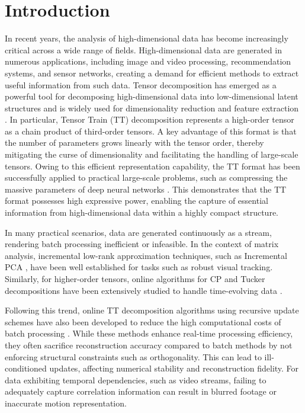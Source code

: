 \documentclass[a4paper, 11pt]{article}
\theoremstyle{plain}
\theoremstyle{definition}
\theoremstyle{remark}
\begin{document}
\section{Introduction}
In recent years, the analysis of high-dimensional data has become increasingly critical across a wide range of fields.
High-dimensional data are generated in numerous applications, including image and video processing, recommendation systems, and sensor networks, creating a demand for efficient methods to extract useful information from such data.
Tensor decomposition has emerged as a powerful tool for decomposing high-dimensional data into low-dimensional latent structures and is widely used for dimensionality reduction and feature extraction \citep{Tensor-Decomposition}.
In particular, Tensor Train (TT) decomposition \citep{Tensor-Train-Decomposition} represents a high-order tensor as a chain product of third-order tensors.
A key advantage of this format is that the number of parameters grows linearly with the tensor order, thereby mitigating the curse of dimensionality and facilitating the handling of large-scale tensors.
Owing to this efficient representation capability, the TT format has been successfully applied to practical large-scale problems, such as compressing the massive parameters of deep neural networks \citep{Novikov-NeurIPS2015}.
This demonstrates that the TT format possesses high expressive power, enabling the capture of essential information from high-dimensional data within a highly compact structure.

In many practical scenarios, data are generated continuously as a stream, rendering batch processing inefficient or infeasible.
In the context of matrix analysis, incremental low-rank approximation techniques, such as Incremental PCA \citep{IVT-Ross}, have been well established for tasks such as robust visual tracking.
Similarly, for higher-order tensors, online algorithms for CP and Tucker decompositions have been extensively studied to handle time-evolving data \citep{DTA-Sun, OnlineCP-Mardani}.

Following this trend, online TT decomposition algorithms using recursive update schemes have also been developed to reduce the high computational costs of batch processing \citep{Survey-Streaming-Tensor-Decomposition}.
While these methods enhance real-time processing efficiency,
they often sacrifice reconstruction accuracy compared to batch methods by not enforcing structural constraints such as orthogonality.
This 
can lead to ill-conditioned updates, affecting numerical stability and reconstruction fidelity.
For data exhibiting temporal dependencies, such as video streams, failing to adequately capture correlation information can 
result in blurred footage or inaccurate motion representation.
\end{document}
